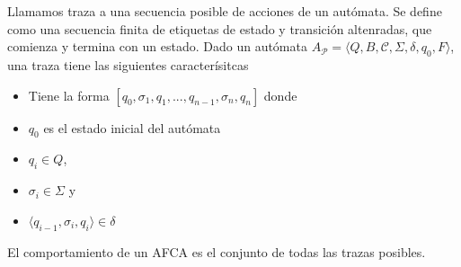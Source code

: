 
\begin{definition} Llamamos traza a una secuencia posible de acciones de un autómata. Se define como una secuencia finita de etiquetas de estado y transición altenradas, que comienza y termina con un estado. Dado un autómata $A_\mathcal{P} = \langle Q, B, \mathcal{C}, \Sigma, \delta, q_0, F\rangle$, una traza tiene las siguientes caracterísitcas

\begin{itemize}
\item Tiene la forma $[q_0, \sigma_1, q_1,...,q_{n-1}, \sigma_n, q_n] $ donde 
\item $q_0$ es el estado inicial del autómata
\item $q_i \in Q$,
\item $ \sigma_i \in \Sigma$ y
\item $\langle q_{i-1}, \sigma_i, q_i \rangle \in \delta $ 
\end{itemize}

El comportamiento de un AFCA es el conjunto de todas las trazas posibles.
\end{definition}




